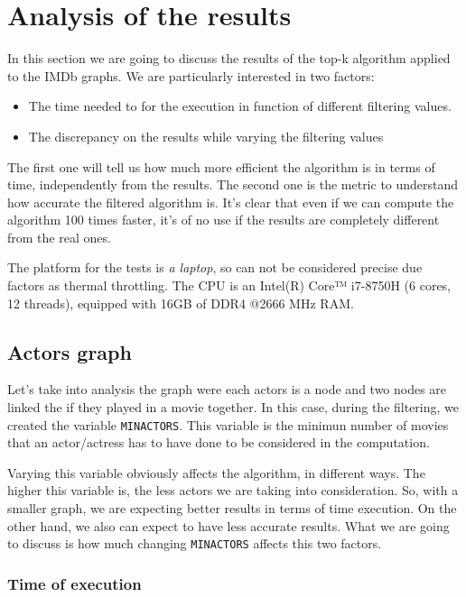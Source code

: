\section{Analysis of the results}
In this section we are going to discuss the results of the top-k algorithm applied to the IMDb graphs. We are particularly interested in two factors:
\begin{itemize}
    \item The time needed to for the execution in function of different filtering values.
    \item The discrepancy on the results while varying the filtering values
\end{itemize}
The first one will tell us how much more efficient the algorithm is in terms of time, independently from the results. The second one is the metric to understand how accurate the filtered algorithm is. It's clear that even if we can compute the algorithm 100 times faster, it's of no use if the results are completely different from the real ones.\s

\nd The platform for the tests is \emph{a laptop}, so can not be considered precise due factors as thermal throttling. The CPU is an Intel(R) Core™ i7-8750H (6 cores, 12 threads), equipped with 16GB of DDR4 @2666 MHz RAM.

\subsection{Actors graph} \label{actors-graph}
Let's take into analysis the graph were each actors is a node and two nodes are linked the if they played in a movie together. In this case, during the filtering, we created the variable \texttt{MIN\textunderscore ACTORS}. This variable is the minimun number of movies that an actor/actress has to have done to be considered in the computation. \s

\nd Varying this variable obviously affects the algorithm, in different ways. The higher this variable is, the less actors we are taking into consideration. So, with a smaller graph, we are expecting better results in terms of time execution. On the other hand, we also can expect to have less accurate results. What we are going to discuss is how much changing \texttt{MIN\textunderscore ACTORS} affects this two factors.

\subsubsection{Time of execution} \label{time-actors}

